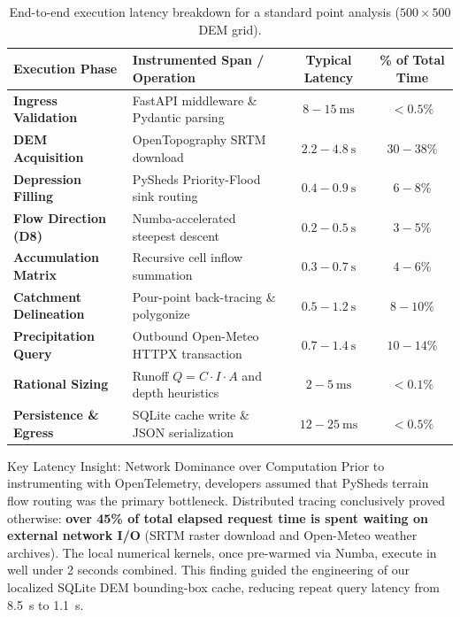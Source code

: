 \documentclass[11pt,a4paper]{article}
\begin{document}
\begin{table}[htbp]
\centering
\small
\begin{tabular}{@{}llcc@{}}
\toprule
\textbf{Execution Phase} & \textbf{Instrumented Span / Operation} & \textbf{Typical Latency} & \textbf{\% of Total Time} \\ \midrule
\textbf{Ingress Validation} & FastAPI middleware \& Pydantic parsing & $8 - 15~\text{ms}$ & $<0.5\%$ \\
\textbf{DEM Acquisition} & OpenTopography SRTM download & $2.2 - 4.8~\text{s}$ & $30 - 38\%$ \\
\textbf{Depression Filling} & PySheds Priority-Flood sink routing & $0.4 - 0.9~\text{s}$ & $6 - 8\%$ \\
\textbf{Flow Direction (D8)} & Numba-accelerated steepest descent & $0.2 - 0.5~\text{s}$ & $3 - 5\%$ \\
\textbf{Accumulation Matrix} & Recursive cell inflow summation & $0.3 - 0.7~\text{s}$ & $4 - 6\%$ \\
\textbf{Catchment Delineation}& Pour-point back-tracing \& polygonize & $0.5 - 1.2~\text{s}$ & $8 - 10\%$ \\
\textbf{Precipitation Query} & Outbound Open-Meteo HTTPX transaction & $0.7 - 1.4~\text{s}$ & $10 - 14\%$ \\
\textbf{Rational Sizing} & Runoff $Q = C \cdot I \cdot A$ and depth heuristics & $2 - 5~\text{ms}$ & $<0.1\%$ \\
\textbf{Persistence \& Egress}& SQLite cache write \& JSON serialization & $12 - 25~\text{ms}$ & $<0.5\%$ \\ \bottomrule
\end{tabular}
\caption{End-to-end execution latency breakdown for a standard point analysis ($500 \times 500$ DEM grid).}
\label{tab:latency_breakdown}
\end{table}

\begin{infobox}{Key Latency Insight: Network Dominance over Computation}
Prior to instrumenting with OpenTelemetry, developers assumed that PySheds terrain flow routing was the primary bottleneck. Distributed tracing conclusively proved otherwise: \textbf{over 45\% of total elapsed request time is spent waiting on external network I/O} (SRTM raster download and Open-Meteo weather archives). The local numerical kernels, once pre-warmed via Numba, execute in well under 2 seconds combined. This finding guided the engineering of our localized SQLite DEM bounding-box cache, reducing repeat query latency from 8.5~s to 1.1~s.
\end{infobox}
\end{document}
